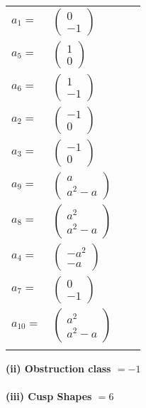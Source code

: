 \documentclass[1p]{elsarticle_modified}
\theoremstyle{definition}
\begin{document}
\begin{tabular}{m{7pt} m{180pt} m{7pt} m{180pt} }
\flushright $a_{1}=$&$\begin{pmatrix}0\\-1\end{pmatrix}$ \\
\flushright $a_{5}=$&$\begin{pmatrix}1\\0\end{pmatrix}$ \\
\flushright $a_{6}=$&$\begin{pmatrix}1\\-1\end{pmatrix}$ \\
\flushright $a_{2}=$&$\begin{pmatrix}-1\\0\end{pmatrix}$ \\
\flushright $a_{3}=$&$\begin{pmatrix}-1\\0\end{pmatrix}$ \\
\flushright $a_{9}=$&$\begin{pmatrix}a\\a^2- a\end{pmatrix}$ \\
\flushright $a_{8}=$&$\begin{pmatrix}a^2\\a^2- a\end{pmatrix}$ \\
\flushright $a_{4}=$&$\begin{pmatrix}- a^2\\- a\end{pmatrix}$ \\
\flushright $a_{7}=$&$\begin{pmatrix}0\\-1\end{pmatrix}$ \\
\flushright $a_{10}=$&$\begin{pmatrix}a^2\\a^2- a\end{pmatrix}$\\&\end{tabular}
\flushleft \textbf{(ii) Obstruction class $= -1$}\\~\\
\flushleft \textbf{(iii) Cusp Shapes $= 6$}\\~\\
\end{document}
